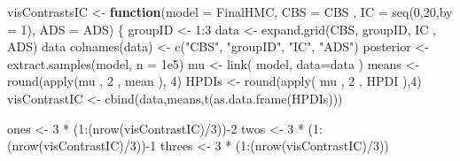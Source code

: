 \documentclass[
  10pt,
  dvipsnames,enabledeprecatedfontcommands]{scrartcl}
\newenvironment{Shaded}{\begin{snugshade}}{\end{snugshade}}
\newcommand{\AttributeTok}[1]{\textcolor[rgb]{0.77,0.63,0.00}{#1}}
\newcommand{\ControlFlowTok}[1]{\textcolor[rgb]{0.13,0.29,0.53}{\textbf{#1}}}
\newcommand{\DecValTok}[1]{\textcolor[rgb]{0.00,0.00,0.81}{#1}}
\newcommand{\FloatTok}[1]{\textcolor[rgb]{0.00,0.00,0.81}{#1}}
\newcommand{\FunctionTok}[1]{\textcolor[rgb]{0.00,0.00,0.00}{#1}}
\newcommand{\NormalTok}[1]{#1}
\newcommand{\OtherTok}[1]{\textcolor[rgb]{0.56,0.35,0.01}{#1}}
\newcommand{\SpecialCharTok}[1]{\textcolor[rgb]{0.00,0.00,0.00}{#1}}
\newcommand{\StringTok}[1]{\textcolor[rgb]{0.31,0.60,0.02}{#1}}
\begin{document}
\vspace{1mm}
\footnotesize

\begin{Shaded}
\begin{Highlighting}[]
\NormalTok{visContrastsIC }\OtherTok{\textless{}{-}} \ControlFlowTok{function}\NormalTok{(}\AttributeTok{model =}\NormalTok{ FinalHMC, }\AttributeTok{CBS =}\NormalTok{ CBS ,}
                           \AttributeTok{IC =}  \FunctionTok{seq}\NormalTok{(}\DecValTok{0}\NormalTok{,}\DecValTok{20}\NormalTok{,}\AttributeTok{by =} \DecValTok{1}\NormalTok{), }\AttributeTok{ADS =}\NormalTok{ ADS)}
\NormalTok{\{}
\NormalTok{  groupID }\OtherTok{\textless{}{-}} \DecValTok{1}\SpecialCharTok{:}\DecValTok{3}
\NormalTok{  data }\OtherTok{\textless{}{-}} \FunctionTok{expand.grid}\NormalTok{(CBS, groupID, IC , ADS)}
\NormalTok{  data}
  \FunctionTok{colnames}\NormalTok{(data) }\OtherTok{\textless{}{-}} \FunctionTok{c}\NormalTok{(}\StringTok{"CBS"}\NormalTok{, }\StringTok{"groupID"}\NormalTok{, }\StringTok{"IC"}\NormalTok{, }\StringTok{"ADS"}\NormalTok{)}
\NormalTok{  posterior }\OtherTok{\textless{}{-}} \FunctionTok{extract.samples}\NormalTok{(model, }\AttributeTok{n =} \FloatTok{1e5}\NormalTok{)}
\NormalTok{  mu }\OtherTok{\textless{}{-}} \FunctionTok{link}\NormalTok{( model, }\AttributeTok{data=}\NormalTok{data ) }
\NormalTok{  means }\OtherTok{\textless{}{-}}  \FunctionTok{round}\NormalTok{(}\FunctionTok{apply}\NormalTok{(mu , }\DecValTok{2}\NormalTok{ , mean ), }\DecValTok{4}\NormalTok{)}
\NormalTok{  HPDIs }\OtherTok{\textless{}{-}} \FunctionTok{round}\NormalTok{(}\FunctionTok{apply}\NormalTok{( mu , }\DecValTok{2}\NormalTok{ , HPDI ),}\DecValTok{4}\NormalTok{)}
\NormalTok{  visContrastIC }\OtherTok{\textless{}{-}} \FunctionTok{cbind}\NormalTok{(data,means,}\FunctionTok{t}\NormalTok{(}\FunctionTok{as.data.frame}\NormalTok{(HPDIs)))}
  
\NormalTok{  ones }\OtherTok{\textless{}{-}} \DecValTok{3} \SpecialCharTok{*}\NormalTok{ (}\DecValTok{1}\SpecialCharTok{:}\NormalTok{(}\FunctionTok{nrow}\NormalTok{(visContrastIC)}\SpecialCharTok{/}\DecValTok{3}\NormalTok{))}\SpecialCharTok{{-}}\DecValTok{2}
\NormalTok{  twos }\OtherTok{\textless{}{-}} \DecValTok{3} \SpecialCharTok{*}\NormalTok{ (}\DecValTok{1}\SpecialCharTok{:}\NormalTok{(}\FunctionTok{nrow}\NormalTok{(visContrastIC)}\SpecialCharTok{/}\DecValTok{3}\NormalTok{))}\SpecialCharTok{{-}}\DecValTok{1}
\NormalTok{  threes }\OtherTok{\textless{}{-}} \DecValTok{3} \SpecialCharTok{*}\NormalTok{ (}\DecValTok{1}\SpecialCharTok{:}\NormalTok{(}\FunctionTok{nrow}\NormalTok{(visContrastIC)}\SpecialCharTok{/}\DecValTok{3}\NormalTok{))}
  

\end{Highlighting}
\end{Shaded}
\end{document}
